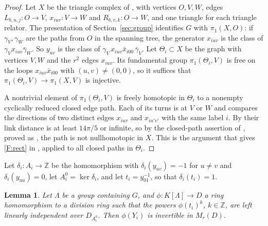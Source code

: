 \documentclass[11pt]{article}
\newtheorem{lemma}[theorem]{Lemma}
\theoremstyle{definition}
\theoremstyle{remark}
\numberwithin{equation}{section}
\newcommand{\Z}{\mathbb Z}
\begin{document}
\begin{proof}
Let $X$ be the triangle complex of \cite[Section~2.3]{OAI252}, with vertices $O,V,W$, edges $L_{b,u,j}\colon O\to V$, $x_{iuv}\colon V\to W$ and $R_{b,v,k}\colon O\to W$, and one triangle for each triangle relator. The presentation of Section~\ref{sec:group} identifies $G$ with $\pi_1(X,O)$: if $\gamma_V,\gamma_W$ are the paths from $O$ in the spanning tree, the generator $x_{iuv}$ is the class of $\gamma_Vx_{iuv}\bar\gamma_W$. So $y_{uv}$ is the class of $\gamma_V\,x_{iuv}\bar x_{i00}\,\bar\gamma_V$. Let $\Theta_i\subset X$ be the graph with vertices $V,W$ and the $r^2$ edges $x_{iuv}$. Its fundamental group $\pi_1(\Theta_i,V)$ is free on the loops $x_{iuv}\bar x_{i00}$ with $(u,v)\ne(0,0)$, so it suffices that $\pi_1(\Theta_i,V)\to\pi_1(X,V)$ is injective.

A nontrivial element of $\pi_1(\Theta_i,V)$ is freely homotopic in $\Theta_i$ to a nonempty cyclically reduced closed edge path. Each of its turns is at $V$ or $W$ and compares the directions of two distinct edges $x_{iuv}$ and $x_{iu'v'}$ with the same label $i$. By \cite[Lemma~2.3]{OAI252} their link distance is at least $14\pi/5$ or infinite, so by the closed-path assertion of \cite[Theorem~2.1]{OAI252}, proved as \cite[Proposition~3.3]{OAI252}, the path is not nullhomotopic in $X$. This is the argument that gives \ref{F:rect} in \cite[(2.6)]{OAI252}, applied to all closed paths in $\Theta_i$.
\end{proof}

Let $\delta_i\colon A_i\to\Z$ be the homomorphism with $\delta_i(y_{uv})=-1$ for $u\ne v$ and $\delta_i(y_{uu})=0$, let $A_i^0=\ker\delta_i$, and let $t_i=y_{01}^{-1}$, so that $\delta_i(t_i)=1$.

\begin{lemma}\label{lem:fullrank}
Let $\Lambda$ be a group containing $G$, and $\phi\colon K[\Lambda]\to D$ a ring homomorphism to a division ring such that the powers $\phi(t_i)^k$, $k\in\Z$, are left linearly independent over $D_{A_i^0}$. Then $\phi(Y_i)$ is invertible in $M_r(D)$.
\end{lemma}
\end{document}
